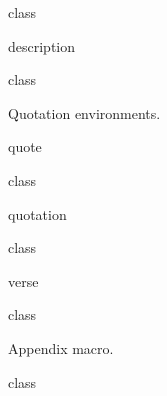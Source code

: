 \documentclass{skdoc}
\begin{document}
	\begin{macro*}{}
	\begin{macro*}{}
	\begin{macro*}{}
	\begin{macro*}{}
\begin{MacroCode}{class}
\newcommand\labelitemi{\textbullet}
\newcommand\labelitemii{\textopenbullet}
\newcommand\labelitemiii{\normalfont\bfseries\textendash}
\newcommand\labelitemiv{\textrightarrow}
\end{MacroCode}
	\end{macro*}
	\end{macro*}
	\end{macro*}
	\end{macro*}
	\begin{environment}{description}
\begin{MacroCode}{class}
\newenvironment{description}
  {\list{}{\labelwidth\z@\itemindent-\leftmargin
    \let\makelabel\descriptionlabel}}{\endlist}
\newcommand*\descriptionlabel[1]{\hspace\labelsep\normalfont\bfseries #1}
\end{MacroCode}
	\end{environment}

	Quotation environments.
	\begin{environment}{quote}
\begin{MacroCode}{class}
\newenvironment{quote}{\list{}{\rightmargin\leftmargin}\item\relax\itshape}{\endlist}
\end{MacroCode}
	\end{environment}
	\begin{environment}{quotation}
\begin{MacroCode}{class}
\newenvironment{quotation}{\bigskip\begin{quote}}{\end{quote}\bigskip}
\end{MacroCode}
	\end{environment}
	\begin{environment}{verse}
\begin{MacroCode}{class}
\newenvironment{verse}{\begin{quote}}{\end{quote}}
\end{MacroCode}
	\end{environment}

	\begin{macro}{\appendix}
	Appendix macro.
\begin{MacroCode}{class}
\newcommand\appendix{\par\setcounter{section}{0}\setcounter{subsection}{0}\gdef\thesection{\@Alph\c@section}}
\end{MacroCode}
	\end{macro}
\end{document}
